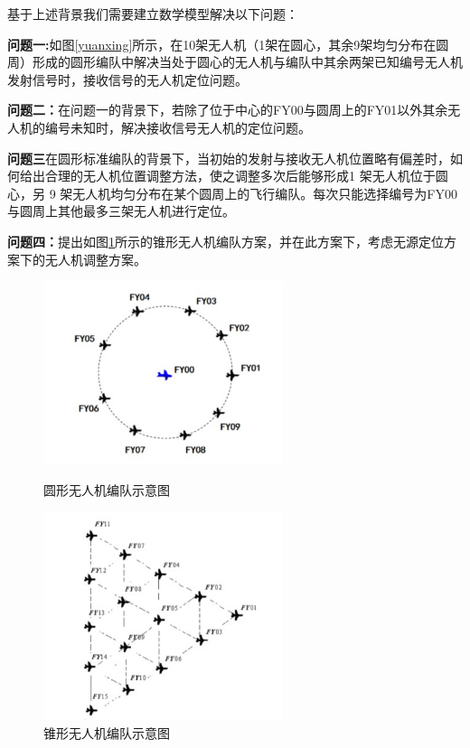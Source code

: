 \documentclass{my_paper}
\begin{document}
基于上述背景我们需要建立数学模型解决以下问题：

\textbf{问题一:}如图\ref{yuanxing}所示，在10架无人机（1架在圆心，其余9架均匀分布在圆周）形成的圆形编队中解决当处于圆心的无人机与编队中其余两架已知编号无人机发射信号时，接收信号的无人机定位问题。

\textbf{问题二：}在问题一的背景下，若除了位于中心的FY00与圆周上的FY01以外其余无人机的编号未知时，解决接收信号无人机的定位问题。

\textbf{问题三}在圆形标准编队的背景下，当初始的发射与接收无人机位置略有偏差时，如何给出合理的无人机位置调整方法，使之调整多次后能够形成1 架无人机位于圆心，另 9 架无人机均匀分布在某个圆周上的飞行编队。每次只能选择编号为FY00与圆周上其他最多三架无人机进行定位。

\textbf{问题四：}提出如图\ref{zhuixing}所示的锥形无人机编队方案，并在此方案下，考虑无源定位方案下的无人机调整方案。

\begin{figure}[htbp]
    \centering
    \begin{minipage}[t]{0.48\textwidth}
        \centering
        \includegraphics[width=7cm]{yuanxing.jpg}
        \caption{圆形无人机编队示意图}
        \label{yuanxing}
    \end{minipage}
    \begin{minipage}[t]{0.48\textwidth}
        \centering
        \includegraphics[width=7cm]{zhuixing.jpg}
        \caption{锥形无人机编队示意图}
        \label{zhuixing}
    \end{minipage}
\end{figure}
\end{document}
